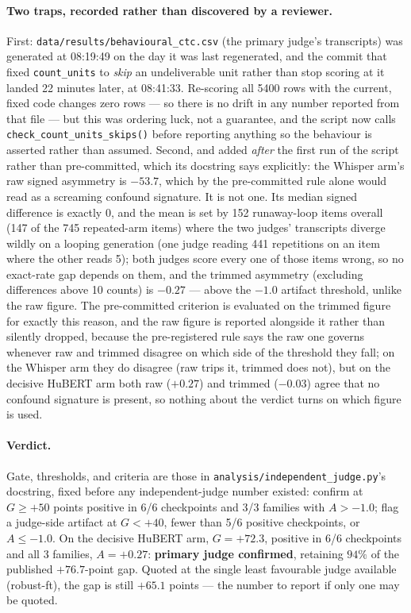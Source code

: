 \documentclass[11pt]{article}
\begin{document}
\paragraph{Two traps, recorded rather than discovered by a reviewer.} First:
\texttt{data/results/behavioural\_ctc.csv} (the primary judge's transcripts)
was generated at 08:19:49 on the day it was last regenerated, and the commit
that fixed \texttt{count\_units} to \emph{skip} an undeliverable unit rather
than stop scoring at it landed 22 minutes later, at 08:41:33. Re-scoring all
5400 rows with the current, fixed code changes zero rows --- so there is no
drift in any number reported from that file --- but this was ordering luck,
not a guarantee, and the script now calls \texttt{check\_count\_units\_skips()}
before reporting anything so the behaviour is asserted rather than assumed.
Second, and added \emph{after} the first run of the script rather than
pre-committed, which its docstring says explicitly: the Whisper arm's raw
signed asymmetry is $-53.7$, which by the pre-committed rule alone would read
as a screaming confound signature. It is not one. Its median signed
difference is exactly $0$, and the mean is set by 152 runaway-loop items
overall (147 of the 745 repeated-arm items) where the two judges' transcripts
diverge wildly on a looping generation (one judge reading 441 repetitions on
an item where the other reads 5); both
judges score every one of those items wrong, so no exact-rate gap depends on
them, and the trimmed asymmetry (excluding differences above 10 counts) is
$-0.27$ --- above the $-1.0$ artifact threshold, unlike the raw figure. The
pre-committed criterion is evaluated on the trimmed figure for exactly this
reason, and the raw figure is reported alongside it rather than silently
dropped, because the pre-registered rule says the raw one governs whenever
raw and trimmed disagree on which side of the threshold they fall; on the
Whisper arm they do disagree (raw trips it, trimmed does not), but on the
decisive HuBERT arm both raw ($+0.27$) and trimmed ($-0.03$) agree that no
confound signature is present, so nothing about the verdict turns on which
figure is used.

\paragraph{Verdict.} Gate, thresholds, and criteria are those in
\texttt{analysis/independent\_judge.py}'s docstring, fixed before any
independent-judge number existed: confirm at $G\ge+50$ points positive in
6/6 checkpoints and 3/3 families with $A>-1.0$; flag a judge-side artifact at
$G<+40$, fewer than 5/6 positive checkpoints, or $A\le-1.0$. On the decisive
HuBERT arm, $G=+72.3$, positive in 6/6 checkpoints and all 3 families,
$A=+0.27$: \textbf{primary judge confirmed}, retaining $94\%$ of the
published $+76.7$-point gap. Quoted at the single least favourable judge
available (robust-ft), the gap is still $+65.1$ points --- the number to
report if only one may be quoted.
\end{document}
